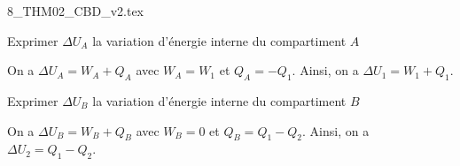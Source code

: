                                 \initialisationPartieDroite %
\begin{center}
	{8_THM02_CBD_v2.tex}
\end{center}
                               \finalisationDuPartageDePage %





\debutEntrainement



\begin{enonce}
Exprimer $\Delta U_A$ la variation d'énergie interne du compartiment $A$
\end{enonce}


\begin{corrige}
On a $\Delta U_A = W_A + Q_A $ avec $W_A=W_1$ et $Q_A=-Q_1$. Ainsi, on a $\Delta U_1 = W_1 + Q_1 $.
\end{corrige}



\begin{enonce}
Exprimer $\Delta U_B$ la variation d'énergie interne du compartiment $B$
\end{enonce}


\begin{corrige}
On a $\Delta U_B = W_B + Q_B $ avec $W_B=0$ et $Q_B=Q_1-Q_2$. Ainsi, on a $\Delta U_2 = Q_1-Q_2$.
\end{corrige}

